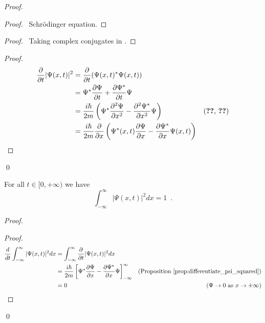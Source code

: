 \begin{proof}
\pf
{}
\begin{proof}
	\pf\ Schr\"{o}dinger equation.
\end{proof}
\begin{proof}
	\pf\ Taking complex conjugates in .
\end{proof}
\begin{proof}
	\pf
	\begin{align*}
		\frac{\partial}{\partial t} |\Psi(x,t)|^2
		& = \frac{\partial}{\partial t} (\Psi(x,t)^* \Psi(x,t)) \\
		& = \Psi^* \frac{\partial \Psi}{\partial t} + \frac{\partial \Psi^*}{\partial t} \Psi \\
		& = \frac{i \hbar}{2m} \left( \Psi^* \frac{\partial^2 \Psi}{\partial x^2} - \frac{\partial^2 \Psi^*}{\partial x^2} \Psi \right) & (\text{\stepref{1}, \stepref{2}}) \\
		& = \frac{i \hbar}{2m} \frac{\partial}{\partial x} \left(
\Psi^*(x,t) \frac{\partial \Psi}{\partial x} - \frac{\partial \Psi^*}{\partial x} \Psi(x,t) \right)
	\end{align*}
\end{proof}
\qed
\end{proof}

\begin{prop}
For all $t \in [0, + \infty)$ we have
\[ \int_{- \infty}^\infty |\Psi(x,t)|^2 dx = 1 \enspace . \]
\end{prop}

\begin{proof}
\pf
{}
\begin{proof}
\pf
\begin{align*}
\frac{d}{dt} \int_{-\infty}^\infty |\Psi(x,t)|^2 dx
& = \int_{-\infty}^\infty \frac{\partial}{\partial t} |\Psi(x,t)|^2 dx \\
& = \frac{i \hbar}{2m} \left[ \Psi^* \frac{\partial \Psi}{\partial x} - \frac{\partial \Psi^*}{\partial x} \Psi \right]_{- \infty}^\infty & (\text{Proposition \ref{prop:differentiate_psi_squared}}) \\
& = 0 & (\Psi \rightarrow 0 \text{ as } x \rightarrow \pm \infty)
\end{align*}
\end{proof}
\qed
\end{proof}

